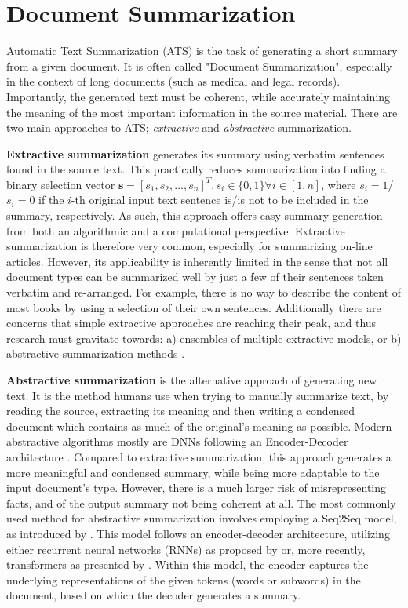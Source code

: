 \documentclass[preprint,review,12pt]{elsarticle}
\begin{document}
\section{Document Summarization}
\label{sec::Summarization}

Automatic Text Summarization (ATS) is the task of generating a short summary from a given document. It is often called "Document Summarization", especially in the context of long documents (such as medical and legal records). Importantly, the generated text must be coherent, while accurately maintaining the meaning of the most important information in the source material. There are two main approaches to ATS; \textit{extractive} and \textit{abstractive} summarization.

\textbf{Extractive summarization} generates its summary using verbatim sentences found in the source text. This practically reduces summarization into finding a binary selection vector $\mathbf{s} = [s_1, s_2,..., s_n]^T, s_i \in \{0,1\} \forall i \in [1,n]$, where $s_i = 1$/$s_i = 0$ if the $i$-th original input text sentence is/is not to be included in the summary, respectively. As such, this approach offers easy summary generation from both an algorithmic and a computational perspective. Extractive summarization is therefore very common, especially for summarizing on-line articles. However, its applicability is inherently limited in the sense that not all document types can be summarized well by just a few of their sentences taken verbatim and re-arranged. For example, there is no way to describe the content of most books by using a selection of their own sentences. Additionally there are concerns that simple extractive approaches are reaching their peak, and thus research must gravitate towards: a) ensembles of multiple extractive models, or b) abstractive summarization methods \cite{mehta}.
	
\textbf{Abstractive summarization} is the alternative approach of generating new text. It is the method humans use when trying to manually summarize text, by reading the source, extracting its meaning and then writing a condensed document which contains as much of the original's meaning as possible. Modern abstractive algorithms mostly are DNNs following an Encoder-Decoder architecture \cite{cho}. Compared to extractive summarization, this approach generates a more meaningful and condensed summary, while being more adaptable to the input document's type. However, there is a much larger risk of misrepresenting facts, and of the output summary not being coherent at all. The most commonly used method for abstractive summarization involves employing a Seq2Seq model, as introduced by \citet{seq2seq}. This model follows an encoder-decoder architecture, utilizing either recurrent neural networks (RNNs) as proposed by \citet{LSTM} or, more recently, transformers as presented by \citet{ilia}. Within this model, the encoder captures the underlying representations of the given tokens (words or subwords) in the document, based on which the decoder generates a summary.
\end{document}
